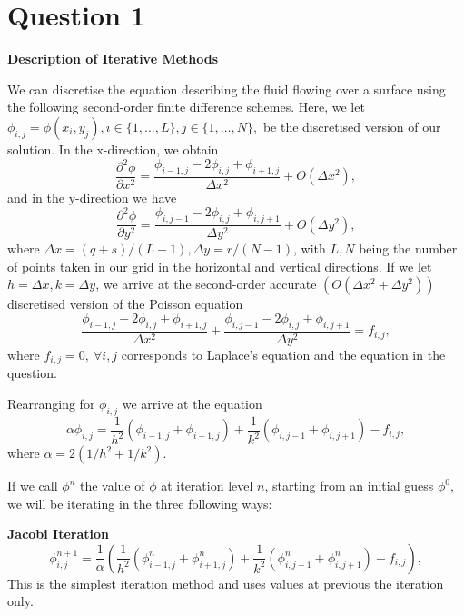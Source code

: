 \documentclass[12pt]{article}
\begin{document}
\newpage
\section{Question 1}
    \textbf{Description of Iterative Methods}

    We can discretise the equation describing the fluid flowing over a surface using the following second-order finite difference schemes. Here, we let $\phi_{i,j} = \phi(x_i, y_j), i \in \{1, \ldots, L\}, j \in \{1, \ldots, N\}, $ be the discretised version of our solution. In the x-direction, we obtain
    \begin{equation}
        \frac{\partial^2 \phi}{\partial x^2} = \frac{\phi_{i-1,j} -2 \phi_{i,j} + \phi_{i+1,j}}{\Delta x^2} + O(\Delta x^2),
    \end{equation}
    and in the y-direction we have
    \begin{equation}
        \frac{\partial^2 \phi}{\partial y^2} = \frac{\phi_{i,j-1} -2 \phi_{i,j} + \phi_{i,j+1}}{\Delta y^2} + O(\Delta y^2),
    \end{equation}
    where $\Delta x = (q+s)/(L - 1), \Delta y = r / (N - 1)$, with $L, N$ being the number of points taken in our grid in the horizontal and vertical directions. If we let $h = \Delta x, k = \Delta y$, we arrive at the second-order accurate $(O(\Delta x ^2 + \Delta y^2))$ discretised version of the Poisson equation
    \begin{equation}
        \frac{\phi_{i-1,j} -2 \phi_{i,j} + \phi_{i+1,j}}{\Delta x^2} +  \frac{\phi_{i,j-1} -2 \phi_{i,j} + \phi_{i,j+1}}{\Delta y^2} = f_{i, j},
    \end{equation}
    where $f_{i, j} = 0,  \ \forall i, j$ corresponds to Laplace's equation and the equation in the question.

    Rearranging for $\phi_{i, j}$ we arrive at the equation
    \begin{equation}\label{eq:discretised_poisson}
        \alpha \phi_{i, j} = \frac{1}{h^2}(\phi_{i-1,j} + \phi_{i+1,j}) + \frac{1}{k^2}(\phi_{i,j - 1} + \phi_{i,j + 1}) - f_{i, j},
    \end{equation}
    where $\alpha = 2\left(1/h^2 + 1/k^2\right).$

    If we call $\phi^n$ the value of $\phi$ at iteration level $n$, starting from an initial guess $\phi^0$, we will be iterating in the three following ways:

    \textbf{Jacobi Iteration}
    \begin{equation}
        \phi_{i, j}^{n+1} = \frac{1}{\alpha}\left(\frac{1}{h^2}(\phi_{i-1,j}^{n} + \phi_{i+1,j}^{n}) + \frac{1}{k^2}(\phi_{i,j - 1}^{n} + \phi_{i,j + 1}^{n}) - f_{i, j}\right),
    \end{equation}
    This is the simplest iteration method and uses values at previous the iteration only.
\end{document}
